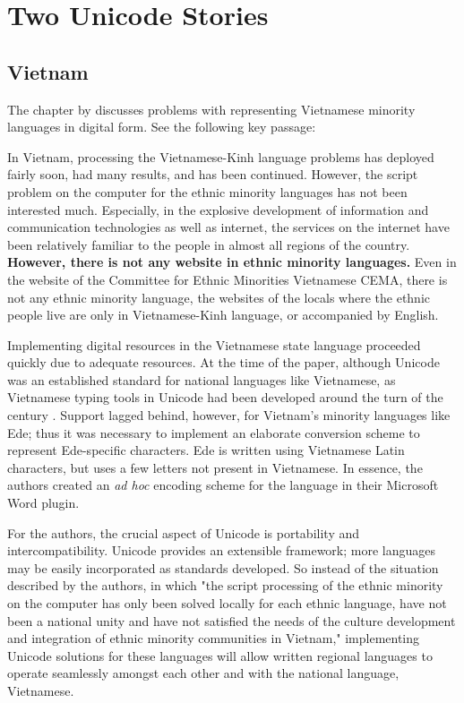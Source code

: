 \section{Two Unicode Stories}

\subsection{Vietnam}

The chapter by \textcite{my13} discusses problems with representing Vietnamese
minority languages in digital form. See the following key passage:

\begin{aquote}{\textcite{my13}}
In Vietnam, processing the Vietnamese-Kinh language problems has deployed fairly
soon, had many results, and has been continued. However, the script problem on
the computer for the ethnic minority languages has not been interested much.
Especially, in the explosive development of information and communication
technologies as well as internet, the services on the internet have been
relatively familiar to the people in almost all regions of the country.
\textbf{However, there is not any website in ethnic minority languages.} Even in
the website of the Committee for Ethnic Minorities Vietnamese CEMA, there is not
any ethnic minority language, the websites of the locals where the ethnic people
live are only in Vietnamese-Kinh language, or accompanied by English.
\end{aquote}

Implementing digital resources in the Vietnamese state language proceeded
quickly due to adequate resources.  At the time of the paper, although Unicode
was an established standard for national languages like Vietnamese, as
Vietnamese typing tools in Unicode had been developed around the turn of the
century \parencite{nguyen18}. Support lagged behind, however, for Vietnam's minority languages like
Ede; thus it was necessary to implement an elaborate conversion scheme to
represent Ede-specific characters. Ede is written using Vietnamese Latin
characters, but uses a few letters not present in Vietnamese. In essence, the
authors created an \textit{ad hoc} encoding scheme for the language in their
Microsoft Word plugin.

For the authors, the crucial aspect of Unicode is portability and
intercompatibility. Unicode provides an extensible framework; more languages may
be easily incorporated as standards developed. So instead of the situation
described by the authors, in which "the script processing of the ethnic minority
on the computer has only been solved locally for each ethnic language, have not
been a national unity and have not satisfied the needs of the culture
development and integration of ethnic minority communities in Vietnam,"
implementing Unicode solutions for these languages will allow written regional
languages to operate seamlessly amongst each other and with the national
language, Vietnamese.

